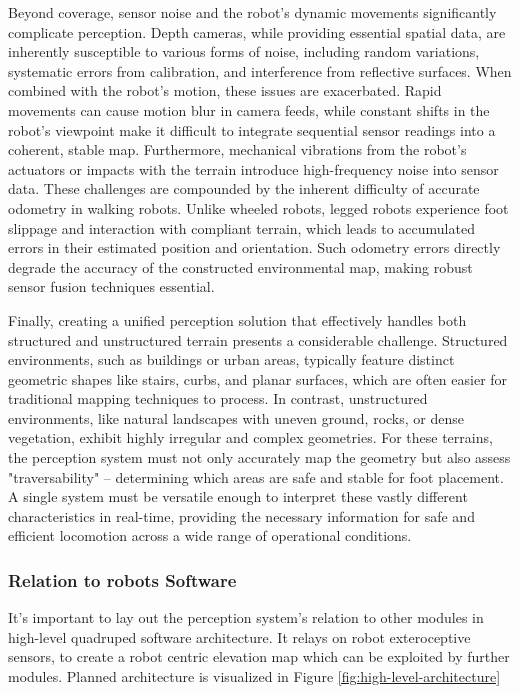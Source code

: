Beyond coverage, sensor noise and the robot's dynamic movements significantly complicate perception. Depth cameras, while providing essential spatial data, are inherently susceptible to various forms of noise, including random variations, systematic errors from calibration, and interference from reflective surfaces. When combined with the robot's motion, these issues are exacerbated. Rapid movements can cause motion blur in camera feeds, while constant shifts in the robot's viewpoint make it difficult to integrate sequential sensor readings into a coherent, stable map. Furthermore, mechanical vibrations from the robot's actuators or impacts with the terrain introduce high-frequency noise into sensor data. These challenges are compounded by the inherent difficulty of accurate odometry in walking robots. Unlike wheeled robots, legged robots experience foot slippage and interaction with compliant terrain, which leads to accumulated errors in their estimated position and orientation. Such odometry errors directly degrade the accuracy of the constructed environmental map, making robust sensor fusion techniques essential.

Finally, creating a unified perception solution that effectively handles both structured and unstructured terrain presents a considerable challenge. Structured environments, such as buildings or urban areas, typically feature distinct geometric shapes like stairs, curbs, and planar surfaces, which are often easier for traditional mapping techniques to process. In contrast, unstructured environments, like natural landscapes with uneven ground, rocks, or dense vegetation, exhibit highly irregular and complex geometries. For these terrains, the perception system must not only accurately map the geometry but also assess "traversability" – determining which areas are safe and stable for foot placement. A single system must be versatile enough to interpret these vastly different characteristics in real-time, providing the necessary information for safe and efficient locomotion across a wide range of operational conditions.


\subsubsection{Relation to robots Software}
It's important to lay out the perception system's relation to other modules in high-level quadruped software architecture. It relays on robot exteroceptive sensors, to create a robot centric elevation map which can be exploited by further modules. Planned architecture is visualized in Figure \ref{fig:high-level-architecture}

